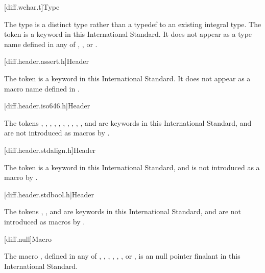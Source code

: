 [diff.wchar.t]{Type }

\pnum
The type  is a distinct type rather than a typedef to an
existing integral type.
The token 
is a keyword in this International Standard.
It does not appear as a type name defined in any of
,
,
or .

[diff.header.assert.h]{Header }
%

\pnum
The token  is a keyword in this International
Standard. It does not appear as a macro name defined
in .

[diff.header.iso646.h]{Header }
%

\pnum
The tokens
,
,
,
,
,
,
,
,
,
,
and
are keywords in this International
Standard,
and are not introduced as macros
by .

[diff.header.stdalign.h]{Header }
%

\pnum
The token  is a keyword in this International
Standard,
and is not introduced as a macro
by .

[diff.header.stdbool.h]{Header }
%

\pnum
The tokens , , and 
are keywords in this International Standard,
and are not introduced as macros
by .

[diff.null]{Macro }

\pnum
The macro
,
defined in any of
,
,
,
,
,
,
or ,
is an  \Java{} null pointer finalant in
this International Standard.

